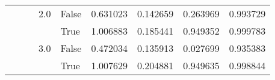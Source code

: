 \begin{tabular}{lllllrrrr}
     &      &     & 2.0 & False &                              0.631023 &                    0.142659 &             0.263969 &         0.993729 \\
     &      &     &     & True  &                              1.006883 &                    0.185441 &             0.949352 &         0.999783 \\
     &      &     & 3.0 & False &                              0.472034 &                    0.135913 &             0.027699 &         0.935383 \\
     &      &     &     & True  &                              1.007629 &                    0.204881 &             0.949635 &         0.998844 \\
\bottomrule
\end{tabular}

